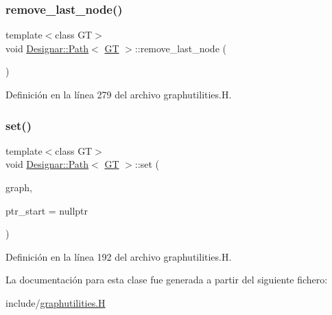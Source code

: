 \subsubsection{\texorpdfstring{remove\+\_\+last\+\_\+node()}{remove\_last\_node()}}
{\footnotesize\ttfamily template$<$class GT$>$ \\
void \hyperlink{class_designar_1_1_path}{Designar\+::\+Path}$<$ \hyperlink{demo-buildgraph_8_c_a3001c40d2c31ca87ed96cd7d1334a55e}{GT} $>$\+::remove\+\_\+last\+\_\+node (\begin{DoxyParamCaption}{ }\end{DoxyParamCaption})\hspace{0.3cm}{\ttfamily [inline]}}



Definición en la línea 279 del archivo graphutilities.\+H.

\mbox{\label{class_designar_1_1_path_a72190e285c2c85aae75b0c8435f1eee9}} 
\subsubsection{\texorpdfstring{set()}{set()}}
{\footnotesize\ttfamily template$<$class GT$>$ \\
void \hyperlink{class_designar_1_1_path}{Designar\+::\+Path}$<$ \hyperlink{demo-buildgraph_8_c_a3001c40d2c31ca87ed96cd7d1334a55e}{GT} $>$\+::set (\begin{DoxyParamCaption}\item[{\hyperlink{demo-buildgraph_8_c_a3001c40d2c31ca87ed96cd7d1334a55e}{GT} \&}]{graph,  }\item[{\hyperlink{class_designar_1_1_path_a7b499fd50e96e3360968d4cfef7a3736}{Node\+Type} $\ast$}]{ptr\+\_\+start = {\ttfamily nullptr} }\end{DoxyParamCaption})\hspace{0.3cm}{\ttfamily [inline]}}



Definición en la línea 192 del archivo graphutilities.\+H.



La documentación para esta clase fue generada a partir del siguiente fichero\+:\begin{DoxyCompactItemize}
\item 
include/\hyperlink{graphutilities_8_h}{graphutilities.\+H}\end{DoxyCompactItemize}
